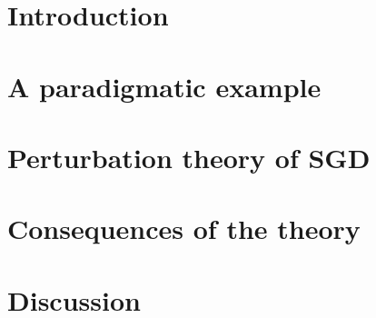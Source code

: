 
    \section{Introduction}\label{sect:intro}
        
           
    \section{A paradigmatic example}\label{sect:entropic-example}
        
      
    \section{Perturbation theory of SGD}\label{sect:calculus}
        

    \section{Consequences of the theory}\label{sect:consequences}
        
       
    \section{Discussion}
        

    
